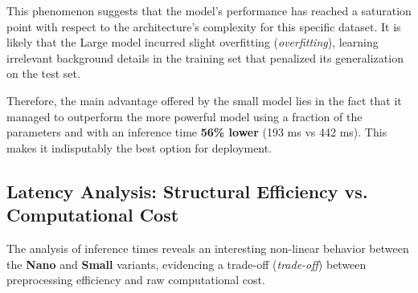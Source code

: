 This phenomenon suggests that the model's performance has reached a saturation point with respect to the architecture's complexity for this specific dataset. It is likely that the Large model incurred slight overfitting (\textit{overfitting}), learning irrelevant background details in the training set that penalized its generalization on the test set.

Therefore, the main advantage offered by the small model lies in the fact that it managed to outperform the more powerful model using a fraction of the parameters and with an inference time \textbf{56\% lower} (193 ms vs 442 ms). This makes it indisputably the best option for deployment.

\subsection{Latency Analysis: Structural Efficiency vs. Computational Cost}

The analysis of inference times reveals an interesting non-linear behavior between the \textbf{Nano} and \textbf{Small} variants, evidencing a trade-off (\textit{trade-off}) between preprocessing efficiency and raw computational cost.

